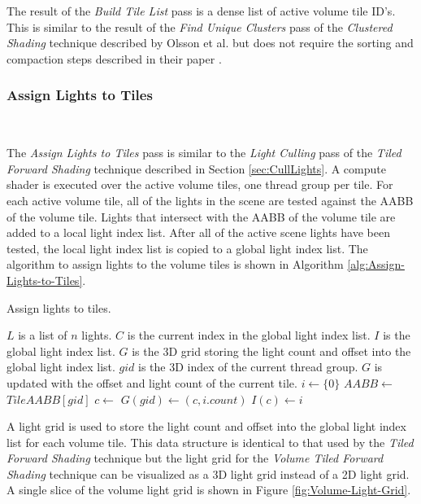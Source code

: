 The result of the \emph{Build Tile List} pass is a dense list of  active volume tile ID's. This is similar to the result of the \emph{Find Unique Clusters} pass of the \emph{Clustered Shading} technique described by Olsson et al. but does not require the sorting and compaction steps described in their paper \parencite{20_olsson_2012}.

\subsubsection{Assign Lights to Tiles}\
\label{sec:Assign_Lights_to_Tiles}

The \emph{Assign Lights to Tiles} pass is similar to the \emph{Light Culling} pass of the \emph{Tiled Forward Shading} technique described in Section \ref{sec:CullLights}. A compute shader is executed over the active volume tiles, one thread group per tile. For each active volume tile, all of the lights in the scene are tested against the AABB of the volume tile. Lights that intersect with the AABB of the volume tile are added to a local light index list. After all of the active scene lights have been tested, the local light index list is copied to a global light index list. The algorithm to assign lights to the volume tiles is shown in Algorithm \ref{alg:Assign-Lights-to-Tiles}.

\begin{algorithm}[h]
\caption{Assign lights to tiles.}
\label{alg:Assign-Lights-to-Tiles}
\begin{algorithmic}[1]
\Require $L$ is a list of $n$ lights.
\Require $C$ is the current index in the global light index list.
\Require $I$ is the global light index list.
\Require $G$ is the 3D grid storing the light count and offset into the global light index list.
\Require $gid$ is the 3D index of the current thread group.
\Ensure $G$ is updated with the offset and light count of the current tile.
\Function{CullLights}{$gid$}
\State $i \gets \{0\}$ 
\State $AABB \gets$ $TileAABB[gid]$
\State {} 
\EndIf
\EndFor
\State $c \gets$ 
\State $G(gid) \gets (c, i.count)$
\State $I(c) \gets i$
\EndFunction
\end{algorithmic}
\end{algorithm}

A light grid is used to store the light count and offset into the global light index list for each volume tile. This data structure is identical to that used by the \emph{Tiled Forward Shading} technique but the light grid for the \emph{Volume Tiled Forward Shading} technique can be visualized as a 3D light grid instead of a 2D light grid. A single slice of the volume light grid is shown in Figure \ref{fig:Volume-Light-Grid}.

